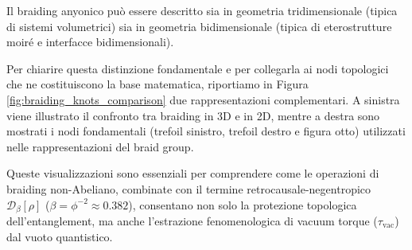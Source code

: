 \documentclass[11pt,a4paper]{article}
\let\oldref\ref
\renewcommand{\ref}{\protect\oldref}
\theoremstyle{plain}
\theoremstyle{definition}
\begin{document}
\vspace{0.5cm}






Il braiding anyonico può essere descritto sia in geometria tridimensionale (tipica di sistemi volumetrici) sia in geometria bidimensionale (tipica di eterostrutture moiré e interfacce bidimensionali). 


\vspace{0.3cm}


Per chiarire questa distinzione fondamentale e per collegarla ai nodi topologici che ne costituiscono la base matematica, riportiamo in Figura \ref{fig:braiding_knots_comparison} due rappresentazioni complementari. A sinistra viene illustrato il confronto tra braiding in 3D e in 2D, mentre a destra sono mostrati i nodi fondamentali (trefoil sinistro, trefoil destro e figura otto) utilizzati nelle rappresentazioni del braid group. 


\vspace{0.3cm}

Queste visualizzazioni sono essenziali per comprendere come le operazioni di braiding non-Abeliano, combinate con il termine retrocausale-negentropico $\mathcal{D}_\beta[\rho]$ ($\beta = \phi^{-2} \approx 0.382$), consentano non solo la protezione topologica dell'entanglement, ma anche l'estrazione fenomenologica di vacuum torque ($\tau_{\text{vac}}$) dal vuoto quantistico.
\end{document}
